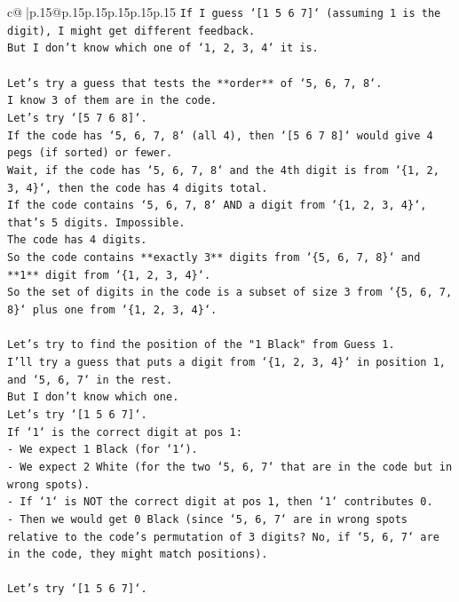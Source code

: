 \documentclass{article}
\begin{document}
{\begin{supertabular}{c@{$\;$}|p{.15\linewidth}@{}p{.15\linewidth}p{.15\linewidth}p{.15\linewidth}p{.15\linewidth}p{.15\linewidth}}
{{{\texttt{If I guess `{[}1 5 6 7{]}` (assuming 1 is the digit), I might get different feedback.} \\
\texttt{But I don't know which one of `1, 2, 3, 4` it is.} \\
\\ 
\texttt{Let's try a guess that tests the **order** of `5, 6, 7, 8`.} \\
\texttt{I know 3 of them are in the code.} \\
\texttt{Let's try `{[}5 7 6 8{]}`.} \\
\texttt{If the code has `5, 6, 7, 8` (all 4), then `{[}5 6 7 8{]}` would give 4 pegs (if sorted) or fewer.} \\
\texttt{Wait, if the code has `5, 6, 7, 8` and the 4th digit is from `\{1, 2, 3, 4\}`, then the code has 4 digits total.} \\
\texttt{If the code contains `5, 6, 7, 8` AND a digit from `\{1, 2, 3, 4\}`, that's 5 digits. Impossible.} \\
\texttt{The code has 4 digits.} \\
\texttt{So the code contains **exactly 3** digits from `\{5, 6, 7, 8\}` and **1** digit from `\{1, 2, 3, 4\}`.} \\
\texttt{So the set of digits in the code is a subset of size 3 from `\{5, 6, 7, 8\}` plus one from `\{1, 2, 3, 4\}`.} \\
\\ 
\texttt{Let's try to find the position of the "1 Black" from Guess 1.} \\
\texttt{I'll try a guess that puts a digit from `\{1, 2, 3, 4\}` in position 1, and `5, 6, 7` in the rest.} \\
\texttt{But I don't know which one.} \\
\texttt{Let's try `{[}1 5 6 7{]}`.} \\
\texttt{If `1` is the correct digit at pos 1:} \\
\texttt{{-} We expect 1 Black (for `1`).} \\
\texttt{{-} We expect 2 White (for the two `5, 6, 7` that are in the code but in wrong spots).} \\
\texttt{{-} If `1` is NOT the correct digit at pos 1, then `1` contributes 0.} \\
\texttt{{-} Then we would get 0 Black (since `5, 6, 7` are in wrong spots relative to the code's permutation of 3 digits? No, if `5, 6, 7` are in the code, they might match positions).} \\
\\ 
\texttt{Let's try `{[}1 5 6 7{]}`.} \\
}}}
\end{supertabular}}
\end{document}
